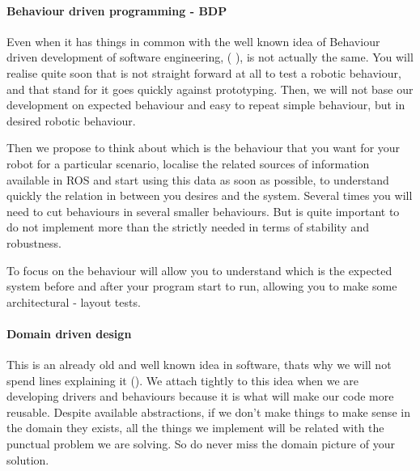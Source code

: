 \documentclass[a4paper,10pt,twoside]{book}
\begin{document}
			\paragraph{Behaviour driven programming - BDP}
			
				Even when it has things in common with the well known idea of Behaviour driven development of software engineering, ( 
				\cite{BDD}), is not actually the same. You will realise quite soon that is not straight forward at all to test a robotic behaviour, and that stand for it goes quickly against prototyping. Then, we will not base our development on expected behaviour and easy to repeat simple behaviour, but in desired robotic behaviour.
				
				Then we propose to think about which is the behaviour that you want for your robot for a particular scenario, localise the related sources of information available in ROS and start using this data as soon as possible, to understand quickly the relation in between you desires and the system. Several times you will need to cut behaviours in several smaller behaviours. But is quite important to do not implement more than the strictly needed in terms of stability and robustness. 
				
				To focus on the behaviour will allow you to understand which is the expected system before and after your program start to run, allowing you to make some architectural - layout tests.   				
				
				
			\paragraph{Domain driven design}
				
				
				This is an already old and well known idea in software, thats why we will not spend lines explaining it (\cite{DDD}). We attach tightly to this idea when we are developing drivers and behaviours because it is what will make our code more reusable. Despite available abstractions, if we don't make things to make sense in the domain they exists, all the things we implement will be related with the punctual problem we are solving. So do never miss the domain picture of your solution.
				




\ifx\wholebook\relax\else
\end{document}

